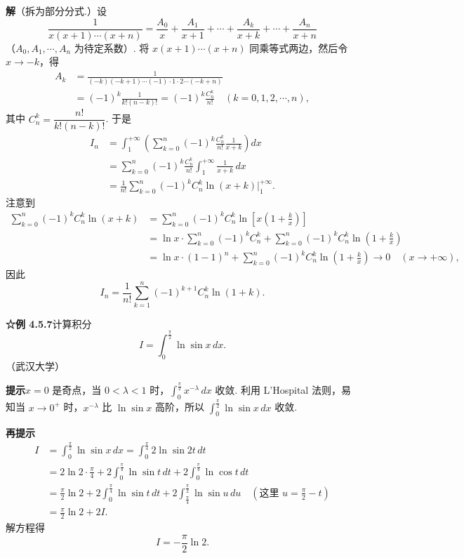 \documentclass[UTF8, 12pt, fontset=fandol, oneside]{ctexart}
\begin{document}
\noindent\textbf{解}\quad （拆为部分分式.）设
\[
\frac1{x(x+1)\cdots(x+n)}
=\frac{A_0}{x}+\frac{A_1}{x+1}+\cdots+\frac{A_k}{x+k}
+\cdots+\frac{A_n}{x+n}
\]
（$A_0,A_1,\cdots,A_n$ 为待定系数）. 将 $x(x+1)\cdots(x+n)$ 同乘等式两边，然后令 $x\to-k$，得
\[
\begin{aligned}
A_k&=\frac1{(-k)(-k+1)\cdots(-1)\cdot1\cdot2\cdots(-k+n)}\\
&=(-1)^k\frac1{k!(n-k)!}=(-1)^k\frac{C_n^k}{n!}\quad(k=0,1,2,\cdots,n),
\end{aligned}
\]
其中 $C_n^k=\dfrac{n!}{k!(n-k)!}$. 于是
\[
\begin{aligned}
I_n&=\int_1^{+\infty}\left(\sum_{k=0}^n(-1)^k\frac{C_n^k}{n!}\frac1{x+k}\right)dx\\
&=\sum_{k=0}^n(-1)^k\frac{C_n^k}{n!}\int_1^{+\infty}\frac1{x+k}\,dx\\
&=\frac1{n!}\sum_{k=0}^n(-1)^k C_n^k\ln(x+k)\Big|_1^{+\infty}.
\end{aligned}
\]
注意到
\[
\begin{aligned}
\sum_{k=0}^n(-1)^k C_n^k\ln(x+k)
&=\sum_{k=0}^n(-1)^k C_n^k\ln\left[x\left(1+\frac{k}{x}\right)\right]\\
&=\ln x\cdot\sum_{k=0}^n(-1)^k C_n^k
+\sum_{k=0}^n(-1)^k C_n^k\ln\left(1+\frac{k}{x}\right)\\
&=\ln x\cdot(1-1)^n+\sum_{k=0}^n(-1)^k C_n^k\ln\left(1+\frac{k}{x}\right)
\longrightarrow0\quad(x\to+\infty),
\end{aligned}
\]
因此
\[
I_n=\frac1{n!}\sum_{k=1}^n(-1)^{k+1}C_n^k\ln(1+k).
\]

\noindent\textbf{☆例 4.5.7}\quad 计算积分
\[
I=\int_0^{\frac\pi2}\ln\sin x\,dx.
\]
（武汉大学）

\noindent\textbf{提示}\quad $x=0$ 是奇点，当 $0<\lambda<1$ 时，$\int_0^{\frac\pi2}x^{-\lambda}\,dx$ 收敛. 利用 L'Hospital 法则，易知当 $x\to0^+$ 时，$x^{-\lambda}$ 比 $\ln\sin x$ 高阶，所以 $\int_0^{\frac\pi2}\ln\sin x\,dx$ 收敛.

\noindent\textbf{再提示}\quad
\[
\begin{aligned}
I&=\int_0^{\frac\pi2}\ln\sin x\,dx
=\int_0^{\frac\pi4}2\ln\sin2t\,dt\\
&=2\ln2\cdot\frac\pi4
+2\int_0^{\frac\pi4}\ln\sin t\,dt
+2\int_0^{\frac\pi4}\ln\cos t\,dt\\
&=\frac\pi2\ln2+2\int_0^{\frac\pi4}\ln\sin t\,dt
+2\int_{\frac\pi4}^{\frac\pi2}\ln\sin u\,du
\quad\left(\text{这里 }u=\frac\pi2-t\right)\\
&=\frac\pi2\ln2+2I.
\end{aligned}
\]
解方程得
\[
I=-\frac\pi2\ln2.
\]
\end{document}
